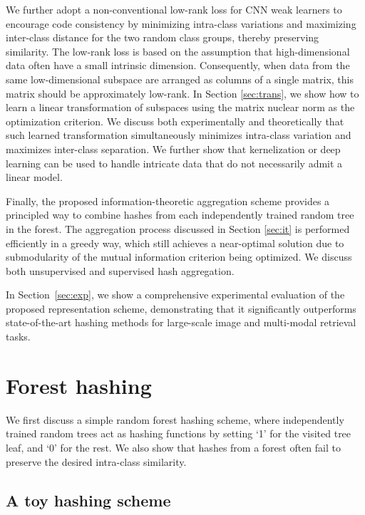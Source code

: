 \documentclass[runningheads]{llncs}
\begin{document}
We further adopt a non-conventional low-rank loss for CNN weak learners to
encourage code consistency by minimizing intra-class variations and maximizing
inter-class distance for the two random class groups, thereby preserving
similarity.  The low-rank loss is based on the assumption that high-dimensional
data often have a small intrinsic dimension.  Consequently, when data from the
same low-dimensional subspace are arranged as columns of a single matrix, this
matrix should be approximately low-rank.  In Section \ref{sec:trans}, we show
how to learn a linear transformation of subspaces using the matrix nuclear norm
as the optimization criterion. We discuss both experimentally and theoretically
that such learned transformation simultaneously minimizes intra-class variation
and maximizes inter-class separation. We further show that kernelization or deep
learning can be used to handle intricate data that do not necessarily admit a
linear model.


Finally, the proposed information-theoretic aggregation scheme provides a
principled way to combine hashes from each independently trained random tree in
the forest. The aggregation process discussed in Section \ref{sec:it} is
performed efficiently in a greedy way, which still achieves a near-optimal
solution due to submodularity of the mutual information criterion being
optimized.  We discuss both unsupervised and supervised hash aggregation.

In Section~\ref{sec:exp}, we show a comprehensive experimental evaluation of the
proposed representation scheme, demonstrating that it significantly outperforms
state-of-the-art hashing methods for large-scale image and multi-modal retrieval
tasks.





\section{Forest hashing}
\label{sec:thm}

We first discuss a simple random forest hashing scheme, where independently
trained random trees act as hashing functions by setting `1' for the visited
tree leaf, and `0' for the rest.  We also show that hashes from a forest often
fail to preserve the desired intra-class similarity.


\subsection{A toy hashing scheme}
\end{document}
